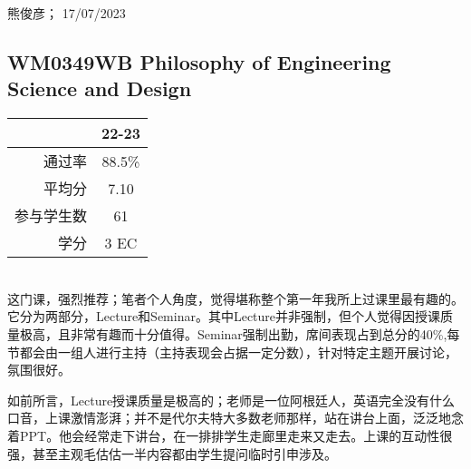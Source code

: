 \begin{flushright}
熊俊彦； 17/07/2023
\end{flushright}

\subsection[WM0349WB Philosophy of Engineering Science and Design]{WM0349WB Philosophy of Engineering Science and Design}\hypertarget{WM0349WB}{} 
\begin{minipage}{0.45\textwidth}
\centering
{}
\end{minipage}%
\begin{minipage}{0.45\textwidth}
\raggedleft
\begin{tabular}{r|c}
\textbf{ } & \textbf{22-23} \\ \hline
通过率 & 88.5\% \\ 
平均分 &  7.10\\ 
参与学生数 &  61\\
学分 & 3 EC\\
\end{tabular}
\end{minipage}\\

这门课，强烈推荐；笔者个人角度，觉得堪称整个第一年我所上过课里最有趣的。它分为两部分，Lecture和Seminar。其中Lecture并非强制，但个人觉得因授课质量极高，且非常有趣而十分值得。Seminar强制出勤，席间表现占到总分的40\%,每节都会由一组人进行主持（主持表现会占据一定分数），针对特定主题开展讨论，氛围很好。

如前所言，Lecture授课质量是极高的；老师是一位阿根廷人，英语完全没有什么口音，上课激情澎湃；并不是代尔夫特大多数老师那样，站在讲台上面，泛泛地念着PPT。他会经常走下讲台，在一排排学生走廊里走来又走去。上课的互动性很强，甚至主观毛估估一半内容都由学生提问临时引申涉及。

